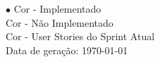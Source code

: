 \begin{landscape}
		\textcolor{rltred}{$\bullet$}
		Cor - Implementado \\
		Cor - Não Implementado \\
		Cor - User Stories do Sprint Atual \\
		Data de geração: \today
		

\end{landscape}
